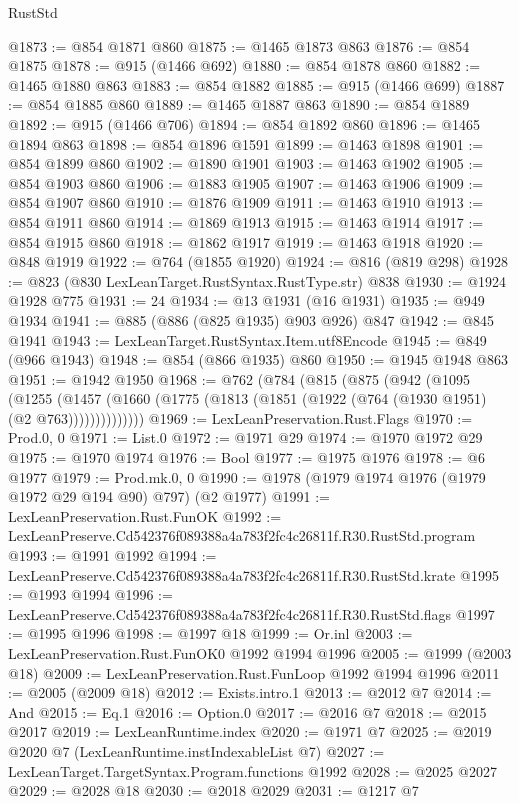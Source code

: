 \begin{lexlean}{RustStd}
\begin{coremodule}
@1873 := @854 @1871 @860
@1875 := @1465 @1873 @863
@1876 := @854 @1875
@1878 := @915 (@1466 @692)
@1880 := @854 @1878 @860
@1882 := @1465 @1880 @863
@1883 := @854 @1882
@1885 := @915 (@1466 @699)
@1887 := @854 @1885 @860
@1889 := @1465 @1887 @863
@1890 := @854 @1889
@1892 := @915 (@1466 @706)
@1894 := @854 @1892 @860
@1896 := @1465 @1894 @863
@1898 := @854 @1896 @1591
@1899 := @1463 @1898
@1901 := @854 @1899 @860
@1902 := @1890 @1901
@1903 := @1463 @1902
@1905 := @854 @1903 @860
@1906 := @1883 @1905
@1907 := @1463 @1906
@1909 := @854 @1907 @860
@1910 := @1876 @1909
@1911 := @1463 @1910
@1913 := @854 @1911 @860
@1914 := @1869 @1913
@1915 := @1463 @1914
@1917 := @854 @1915 @860
@1918 := @1862 @1917
@1919 := @1463 @1918
@1920 := @848 @1919
@1922 := @764 (@1855 @1920)
@1924 := @816 (@819 @298)
@1928 := @823 (@830 LexLeanTarget.RustSyntax.RustType.str) @838
@1930 := @1924 @1928 @775
@1931 := 24
@1934 := @13 @1931 (@16 @1931)
@1935 := @949 @1934
@1941 := @885 (@886 (@825 @1935) @903 @926) @847
@1942 := @845 @1941
@1943 := LexLeanTarget.RustSyntax.Item.utf8Encode
@1945 := @849 (@966 @1943)
@1948 := @854 (@866 @1935) @860
@1950 := @1945 @1948 @863
@1951 := @1942 @1950
@1968 := @762
    (@784
      (@815
        (@875
          (@942
            (@1095
              (@1255
                (@1457 (@1660 (@1775 (@1813 (@1851 (@1922 (@764 (@1930 @1951) (@2 @763))))))))))))))
@1969 := LexLeanPreservation.Rust.Flags
@1970 := Prod.{0, 0}
@1971 := List.{0}
@1972 := @1971 @29
@1974 := @1970 @1972 @29
@1975 := @1970 @1974
@1976 := Bool
@1977 := @1975 @1976
@1978 := @6 @1977
@1979 := Prod.mk.{0, 0}
@1990 := @1978 (@1979 @1974 @1976 (@1979 @1972 @29 @194 @90) @797) (@2 @1977)
@1991 := LexLeanPreservation.Rust.FunOK
@1992 := LexLeanPreserve.Cd542376f089388a4a783f2fc4c26811f.R30.RustStd.program
@1993 := @1991 @1992
@1994 := LexLeanPreserve.Cd542376f089388a4a783f2fc4c26811f.R30.RustStd.krate
@1995 := @1993 @1994
@1996 := LexLeanPreserve.Cd542376f089388a4a783f2fc4c26811f.R30.RustStd.flags
@1997 := @1995 @1996
@1998 := @1997 @18
@1999 := Or.inl
@2003 := LexLeanPreservation.Rust.FunOK0 @1992 @1994 @1996
@2005 := @1999 (@2003 @18)
@2009 := LexLeanPreservation.Rust.FunLoop @1992 @1994 @1996
@2011 := @2005 (@2009 @18)
@2012 := Exists.intro.{1}
@2013 := @2012 @7
@2014 := And
@2015 := Eq.{1}
@2016 := Option.{0}
@2017 := @2016 @7
@2018 := @2015 @2017
@2019 := LexLeanRuntime.index
@2020 := @1971 @7
@2025 := @2019 @2020 @7 (LexLeanRuntime.instIndexableList @7)
@2027 := LexLeanTarget.TargetSyntax.Program.functions @1992
@2028 := @2025 @2027
@2029 := @2028 @18
@2030 := @2018 @2029
@2031 := @1217 @7

\end{coremodule}
\end{lexlean}
